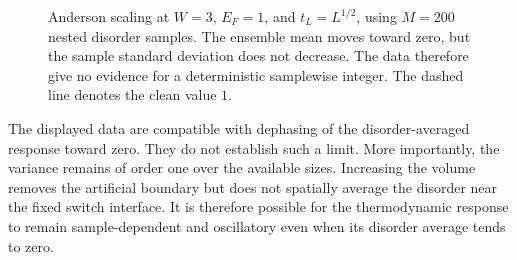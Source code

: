 \documentclass[a4paper,10pt]{article}
\numberwithin{equation}{section}
\theoremstyle{plain}
\theoremstyle{plain}
\theoremstyle{plain}
\theoremstyle{plain}
\theoremstyle{plain}
\theoremstyle{remark}
\theoremstyle{definition}
\theoremstyle{plain}
\begin{document}
\begin{figure}[ht]
\centering
{}
\caption{Anderson scaling at $W=3$, $E_F=1$, and
$t_L=L^{1/2}$, using $M=200$ nested disorder samples. The ensemble mean
moves toward zero, but the sample standard deviation does not decrease.
The data therefore give no evidence for a deterministic samplewise integer.
The dashed line denotes the clean value $1$.}
\label{fig:Anderson scaling}
\end{figure}

The displayed data are compatible with dephasing of the disorder-averaged
response toward zero. They do not establish such a limit. More importantly,
the variance remains of order one over the available sizes. Increasing the
volume removes the artificial boundary but does not spatially average the
disorder near the fixed switch interface. It is therefore possible for the
thermodynamic response to remain sample-dependent and oscillatory even when
its disorder average tends to zero.
\end{document}
